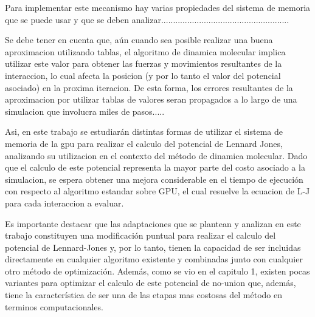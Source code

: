 \documentclass[a4paper,10pt]{report}
\begin{document}

Para implementar este mecanismo hay varias propiedades del sistema de memoria que se puede usar y que se deben analizar......................................................




Se debe tener en cuenta que, aún cuando sea posible realizar una buena aproximacion utilizando tablas, el algoritmo de dinamica molecular implica utilizar este valor para obtener las fuerzas y movimientos resultantes de la interaccion, lo cual afecta la posicion (y por lo tanto el valor del potencial asociado) en la proxima iteracion. De esta forma, los errores resultantes de la aproximacion por utilizar tablas de valores seran propagados a lo largo de una simulacion que involucra miles de pasos.....



Asi, en este trabajo se estudiarán distintas formas de utilizar el sistema de memoria de la gpu para realizar el calculo del potencial de Lennard Jones, analizando su utilizacion en el contexto del método de dinamica molecular. Dado que el calculo de este potencial representa la mayor parte del costo asociado a la simulacion, se espera obtener una mejora considerable en el tiempo de ejecución con respecto al algoritmo estandar sobre GPU, el cual resuelve la ecuacion de L-J para cada interaccion a evaluar.


Es importante destacar que las adaptaciones que se plantean y analizan en este trabajo constituyen una modificación puntual para realizar el calculo del potencial de Lennard-Jones y, por lo tanto, tienen la capacidad de ser incluidas directamente en cualquier algoritmo existente y combinadas junto con cualquier otro método de optimización.
Además, como se vio en el capitulo 1, existen pocas variantes para optimizar el calculo de este potencial de no-union que, además, tiene la característica de ser una de las etapas mas costosas del método en terminos computacionales.
\end{document}
